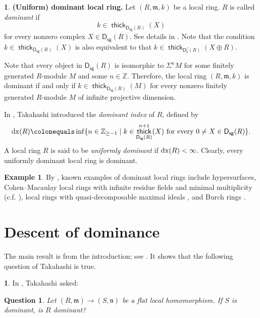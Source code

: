\documentclass{amsart}
\newcommand{\n}{\mathfrak{n}}
\newcommand{\D}{\mathsf{D}}
\newcommand{\0}{{\bf{0}}}
\newcommand{\m}{\mathfrak{m}}
\DeclareMathOperator{\thick}{\mathsf{thick}}
\newcommand{\sg}{\mathsf{sg}}
\newtheorem*{Question}{Question}
\theoremstyle{definition}
\newtheorem{example}[theorem]{Example}
\newtheorem{chunk}[theorem]{}
\begin{document}
\begin{chunk}\label{dominant}
\textbf{(Uniform) dominant local ring.}
Let $(R,\m,k)$ be a local ring. $R$ is called \emph{dominant} if
\[
k\in \thick_{\D_{\sg}(R)}(X)
\]
for every nonzero complex $X\in\D_{\sg}(R)$. See details in \cite{Takahashi:2023}. Note that the condition $k\in\thick_{\D_{\sg}(R)}(X)$ is also equivalent to that $k\in\thick_{\D^f_b(R)}(X\oplus R)$. 

Note that every object in $\D_{\sg}(R)$ is isomorphic to $\Sigma^nM$ for some finitely generated $R$-module $M$ and some $n\in\mathbb Z$. Therefore, the local ring $(R,\mathfrak m,k)$ is dominant if and only if
$k\in \thick_{\D_{\sg}(R)}(M)
$
for every nonzero finitely generated $R$-module $M$ of infinite projective dimension.

In \cite[Definition 5.3]{Takahashi:2026}, Takahashi introduced the \emph{dominant index} of $R$, defined by
\[
{\rm dx}(R)\colonequals \inf\{ n\in\mathbb{Z}_{\geq -1}\mid 
k\in\thick^{n+1}_{\D_{\sg}(R)}(X) \text{ for every }0\neq X\in\D_{\sg}(R)\}.
\]
A local ring $R$ is said to be \emph{uniformly dominant} if ${\rm dx}(R)<\infty$. Clearly, every uniformly dominant local ring is dominant.

\end{chunk}
\begin{example}\label{example}
    By \cite[Proposition 5.10]{Takahashi:2023}, known examples of dominant local rings include hypersurfaces, Cohen--Macaulay local rings with infinite residue fields and minimal multiplicity (c.f. ), local rings with quasi-decomposable maximal ideals \cite{NT}, and Burch rings \cite{DKT2020}.
\end{example}


\section{Descent of dominance}
The main result is  from the introduction; see . It shows that the following question of Takahashi is true. 
\begin{chunk}\label{flathom}
   In \cite[Question 7.5]{Takahashi:2023},  Takahashi asked:
   \begin{Question}
       Let $(R,\m)\rightarrow (S,\n)$ be a flat local homomorphism. If $S$ is dominant, is $R$ dominant?
   \end{Question}
\end{chunk}
\end{document}
